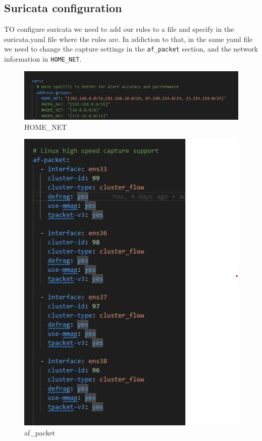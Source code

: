 \documentclass{article}
\begin{document}
\subsection{Suricata configuration}
\texttt{}\par TO configure suricata we need to add our rules to a file and specify in the suricata.yaml file where the rules are. In addiction to that, in the same yaml file we need to change the capture settings in the \texttt{af\_packet} section, and the network information in \texttt{HOME\_NET}.



\texttt{}\par
\begin{figure}[H]
    \centering
    \includegraphics[scale=0.5]{suricata/config_home_net.png}
    \caption{HOME\_NET}
    \label{fig:network-arc}
\end{figure}

\texttt{}\par
\begin{figure}[H]
    \centering
    \includegraphics[scale=0.5]{suricata/config_af_packet.png}
    \caption{af\_packet}
    \label{fig:network-arc}
\end{figure}
\end{document}
